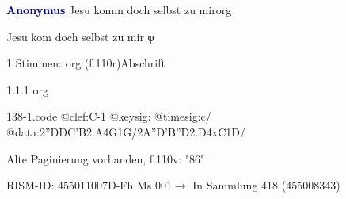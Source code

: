 \documentclass[twocolumn]{book}
\begin{document}
\par \vspace{7pt} \textcolor{darkblue}{\textbf{Anonymus  }}\hfillplus{\textbf{[138]}}\newline Jesu komm doch selbst zu mir\newline org
\par \begin{itshape} Jesu kom doch selbst zu mir φ\end{itshape} 
\par \textcolor{darkblue}{}  1 Stimmen: org  (f.110r)\newline Abschrift
\par 1.1.1  org  
\begin{filecontents*}{138-1.code}
@clef:C-1
@keysig:
@timesig:c/
@data:2''DDC'B2.A4G1G/2A''D'B''D2.D4xC1D/
\end{filecontents*}
\newline
%
\par Alte Paginierung vorhanden, f.110v: "86"
\par RISM-ID: 455011007\newline D-Fh  Ms 001\newline $\rightarrow$ In Sammlung 418 (455008343)
      
\end{document}
